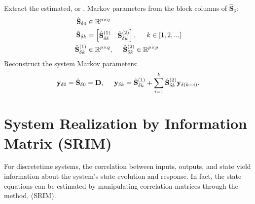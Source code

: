 \documentclass[letterpaper,10pt,english]{sphinxmanual}
\begin{document}
\sphinxAtStartPar
Extract the estimated, or , Markov parameters from the block
columns of \(\hat{\mathbf{S}}_\delta\):
\begin{equation*}
\begin{split}\begin{aligned}
        \hat{\mathbf{S}}_{\delta 0} &\in \mathbb{R}^{p\times q} \\
        \hat{\mathbf{S}}_{\delta k} &=
        \begin{bmatrix} \hat{\mathbf{S}}_{\delta k}^{(1)} & \hat{\mathbf{S}}_{\delta k}^{(2)} \end{bmatrix} , \hspace{0.5cm} k\in[1,2,...] \\
    \hat{\mathbf{S}}_{\delta k}^{(1)} &\in\mathbb{R}^{p\times q}, \hspace{0.5cm}
    \hat{\mathbf{S}}_{\delta k}^{(2)}  \in\mathbb{R}^{p\times p}
\end{aligned}\end{split}
\end{equation*}
\sphinxAtStartPar
Reconstruct the system Markov parameters:
\begin{equation*}
\begin{split}\mathbf{y}_{\delta 0} = \hat{\mathbf{S}}_{\delta 0} = \mathbf{D}, \hspace{0.5cm}
\mathbf{y}_{\delta k} = \hat{\mathbf{S}}_{\delta k}^{(1)}
+ \sum_{i=1}^{k}{\hat{\mathbf{S}}_{\delta k}^{(2)}}\mathbf{y}_{\delta (k-i)}.\end{split}
\end{equation*}
\sphinxstepscope


\section{System Realization by Information Matrix (SRIM)}
\label{\detokenize{theory/srim:system-realization-by-information-matrix-srim}}\label{\detokenize{theory/srim::doc}}
\sphinxAtStartPar
For discrete\sphinxhyphen{}time systems, the correlation between inputs, outputs, and
state yield information about the system’s state evolution and response.
In fact, the state equations can be estimated by manipulating
correlation matrices through the method,  (SRIM).
\end{document}
